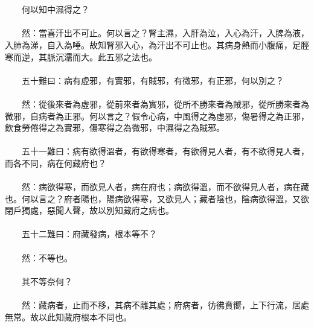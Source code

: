 \\\\
　　何以知中濕得之？
\\\\
　　然：當喜汗出不可止。何以言之？腎主濕，入肝為泣，入心為汗，入脾為液，入肺為涕，自入為唾。故知腎邪入心，為汗出不可止也。其病身熱而小腹痛，足脛寒而逆，其脈沉濡而大。此五邪之法也。
\\\\
　　五十難曰：病有虛邪，有實邪，有賊邪，有微邪，有正邪，何以別之？
\\\\
　　然：從後來者為虛邪，從前來者為實邪，從所不勝來者為賊邪，從所勝來者為微邪，自病者為正邪。何以言之？假令心病，中風得之為虛邪，傷暑得之為正邪，飲食勞倦得之為實邪，傷寒得之為微邪，中濕得之為賊邪。
\\\\
　　五十一難曰：病有欲得溫者，有欲得寒者，有欲得見人者，有不欲得見人者，而各不同，病在何藏府也？
\\\\
　　然：病欲得寒，而欲見人者，病在府也；病欲得溫，而不欲得見人者，病在藏也。何以言之？府者陽也，陽病欲得寒，又欲見人；藏者陰也，陰病欲得溫，又欲閉戶獨處，惡聞人聲，故以別知藏府之病也。
\\\\
　　五十二難曰：府藏發病，根本等不？
\\\\
　　然：不等也。
\\\\
　　其不等奈何？
\\\\
　　然：藏病者，止而不移，其病不離其處；府病者，彷彿賁嚮，上下行流，居處無常。故以此知藏府根本不同也。